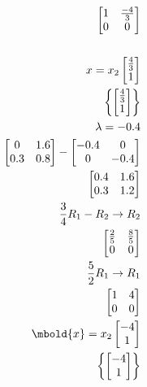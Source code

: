\documentclass[12pt letter]{report}
\begin{document}
{\begin{enumerate}
\begin{align*}
\begin{bmatrix}
              1 & \frac{-4}{3} \\
              0 & 0            \\
            \end{bmatrix}
            \\
            \\
            x = x_2\begin{bmatrix} \frac{4}{3} \\ 1 \end{bmatrix}                    \\
            \left\{ \begin{bmatrix} \frac{4}{3} \\ 1 \end{bmatrix} \right\}
            \\
            \lambda = -0.4                                                           \\
            \begin{bmatrix}
              0   & 1.6 \\
              0.3 & 0.8
            \end{bmatrix} - \begin{bmatrix} -0.4 & 0 \\ 0 & -0.4 \end{bmatrix}       \\
            \begin{bmatrix}
              0.4 & 1.6 \\
              0.3 & 1.2
            \end{bmatrix}                                                           \\
            \frac{3}{4}R_1 - R_2  \rightarrow R_2                                    \\
            \begin{bmatrix}
              \frac{2}{5} & \frac{8}{5} \\
              0           & 0           \\
            \end{bmatrix}
            \\
            \frac{5}{2}R_1 \to R_1                                                   \\
            \begin{bmatrix}
              1 & 4 \\
              0 & 0 \\
            \end{bmatrix}
            \\
            \mbold{x} = x_2 \begin{bmatrix} - 4\\ 1 \end{bmatrix}                    \\
            \left\{ \begin{bmatrix} - 4\\ 1 \end{bmatrix} \right\}
          \end{align*}


\end{enumerate}}
\end{document}
